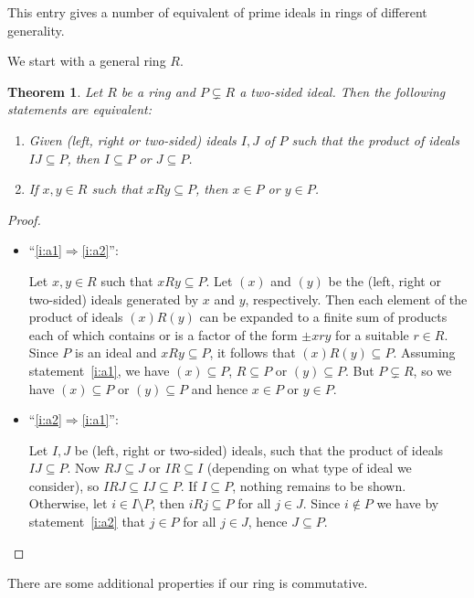 \documentclass[12pt]{article}
\newcommand{\<}{\langle}
\renewcommand{\>}{\rangle}
\begin{document}
\newtheorem{thm}{Theorem}
This entry gives a number of equivalent 
of prime ideals in rings of different generality.

We start with a general ring $R$.

\begin{thm}
\label{thm:nounit}
Let $R$ be a ring and $P\subsetneq R$ a two-sided ideal. Then the
following statements are equivalent:
\begin{enumerate}
\item\label{i:a1} Given (left, right or two-sided) ideals $I,J$ of $P$
  such that the product of ideals $IJ\subseteq P$, then $I\subseteq P$
  or $J\subseteq P$.
\item\label{i:a2} If $x,y\in R$ such that $xRy\subseteq P$, then $x\in
  P$ or $y\in P$.
\end{enumerate}
\end{thm}
\begin{proof}
\begin{itemize}
\item ``\ref{i:a1}$\Rightarrow$\ref{i:a2}'':

Let $x,y\in R$ such that $xRy\subseteq P$. Let $(x)$ and $(y)$ be the
(left, right or two-sided) ideals generated by $x$ and $y$,
respectively. Then each element of the product of ideals $(x)R(y)$ can
be expanded to a finite sum of products each of which contains or is a
factor of the form $\pm xry$ for a suitable $r\in R$. Since $P$ is an
ideal and $xRy\subseteq P$, it follows that $(x)R(y)\subseteq
P$. Assuming statement~\ref{i:a1}, we have $(x)\subseteq P$,
$R\subseteq P$ or $(y)\subseteq P$. But $P\subsetneq R$, so we have
$(x)\subseteq P$ or $(y)\subseteq P$ and hence $x\in P$ or $y\in P$.

\item ``\ref{i:a2}$\Rightarrow$\ref{i:a1}'':

Let $I,J$ be (left, right or two-sided) ideals, such that the product
of ideals $IJ\subseteq P$. Now $RJ\subseteq J$ or $IR\subseteq I$
(depending on what type of ideal we consider), so $IRJ\subseteq
IJ\subseteq P$. If $I\subseteq P$, nothing remains to be shown. Otherwise,
let $i\in I\setminus P$, then $iRj\subseteq P$ for all $j\in J$. Since
$i\notin P$ we have by statement~\ref{i:a2} that $j\in P$ for all $j\in
J$, hence $J\subseteq P$.
\end{itemize}
\end{proof}


There are some additional properties if our ring is commutative.
\end{document}

